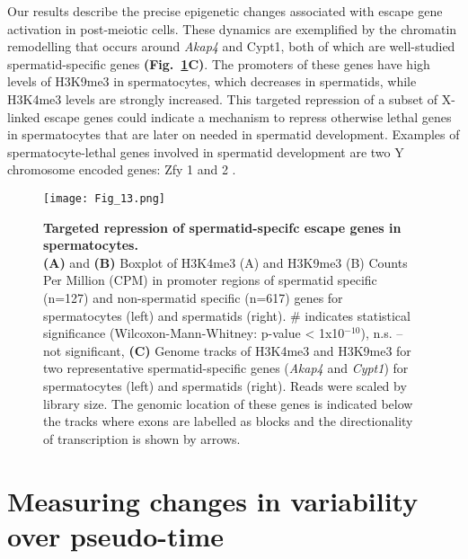 Our results describe the precise epigenetic changes associated with escape gene activation in post-meiotic cells. These dynamics are exemplified by the chromatin remodelling that occurs around \textit{Akap4} and \gls{Cypt1}, both of which are well-studied spermatid-specific genes \textbf{(Fig.~\ref{fig3:K9_K4_targeted}C)}. The promoters of these genes have high levels of H3K9me3 in spermatocytes, which decreases in spermatids, while H3K4me3 levels are strongly increased. This targeted repression of a subset of X-linked escape genes could indicate a mechanism to repress otherwise lethal genes in spermatocytes that are later on needed in spermatid development. Examples of spermatocyte-lethal genes involved in spermatid development are two Y chromosome encoded genes: \gls{Zfy} 1 and 2 \citep{Royo2010}.

\newpage

\begin{figure}[!h]
\centering
\texttt{[image: Fig\_13.png]}
\caption[Targeted repression of spermatid-specifc escape genes in spermatocytes]{\textbf{Targeted repression of spermatid-specifc escape genes in spermatocytes.} \\
\textbf{(A)} and \textbf{(B)} Boxplot of H3K4me3 (A) and H3K9me3 (B) Counts Per Million (CPM) in promoter regions of spermatid specific (n=127) and non-spermatid specific (n=617) genes for spermatocytes (left) and spermatids (right).  \# indicates statistical significance (Wilcoxon-Mann-Whitney: p-value < 1x10$^{-10}$), n.s. – not significant, 
\textbf{(C)} Genome tracks of H3K4me3 and H3K9me3 for two representative spermatid-specific genes (\textit{Akap4} and \textit{Cypt1}) for spermatocytes (left) and spermatids (right). Reads were scaled by library size. The genomic location of these genes is indicated below the tracks where exons are labelled as blocks and the directionality of transcription is shown by arrows.}
\label{fig3:K9_K4_targeted}
\end{figure}

\newpage

\section{Measuring changes in variability over pseudo-time}
\label{sec3:variability_over_PT}

